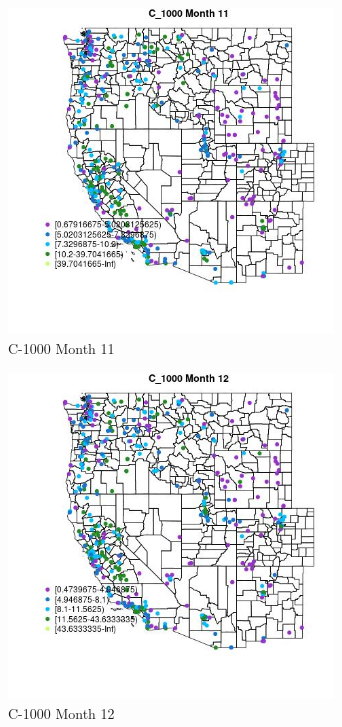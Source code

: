\begin{figure} 
\centering  
\includegraphics[width=0.77\textwidth]{Code_Outputs/ML_input_report_ML_input_PM25_Step5_part_d_de_duplicated_aves_ML_input_MapObsMo11C_1000.jpg} 
\caption{\label{fig:ML_input_report_ML_input_PM25_Step5_part_d_de_duplicated_aves_ML_inputMapObsMo11C_1000}C-1000 Month 11} 
\end{figure} 
 

\begin{figure} 
\centering  
\includegraphics[width=0.77\textwidth]{Code_Outputs/ML_input_report_ML_input_PM25_Step5_part_d_de_duplicated_aves_ML_input_MapObsMo12C_1000.jpg} 
\caption{\label{fig:ML_input_report_ML_input_PM25_Step5_part_d_de_duplicated_aves_ML_inputMapObsMo12C_1000}C-1000 Month 12} 
\end{figure} 
 

